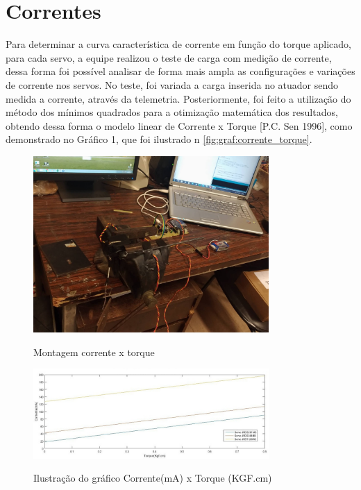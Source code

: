 \section{Correntes}

Para determinar a curva característica de corrente em função do torque aplicado, para
cada servo, a equipe realizou o teste de carga com medição de corrente, dessa forma foi possível
analisar de forma mais ampla as configurações e variações de corrente nos servos. No teste, foi
variada a carga inserida no atuador sendo medida a corrente, através da telemetria.
Posteriormente, foi feito a utilização do método dos mínimos quadrados para a otimização
matemática dos resultados, obtendo dessa forma o modelo linear de Corrente x Torque [P.C.
Sen 1996], como demonstrado no Gráfico 1, que foi ilustrado n \autoref{fig:graf:corrente_torque}.

\begin{figure}[H]
    \centering
    \caption{Montagem corrente x torque}
    \includegraphics[width=0.8\textwidth]{./Imagens/Montagem}
    \label{fig:montagem}
\end{figure}

\begin{figure}[H]
    \centering
    \caption{Ilustração do gráfico Corrente(mA) x Torque (KGF.cm)}
    \includegraphics[width=0.8\textwidth]{./Imagens/Grafico_corrente_torque}
    \label{fig:graf:corrente_torque}
\end{figure}

